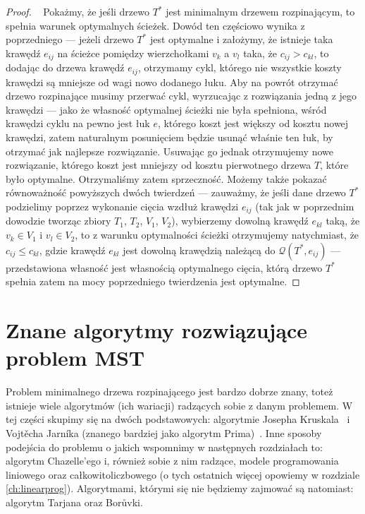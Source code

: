 \begin{proof}~\cite[$519$]{Ahuja:1993:NFT:137406}
	Pokażmy, że jeśli drzewo $T^{\ast}$ jest minimalnym drzewem rozpinającym, to spełnia warunek optymalnych ścieżek.
	Dowód ten częściowo wynika z poprzedniego --- jeżeli drzewo $T^{\ast}$ jest optymalne i założymy, że istnieje taka krawędź $e_{ij}$ na ścieżce pomiędzy wierzchołkami $v_{k}$ a $v_{l}$ taka, że $c_{ij} > c_{kl}$, to dodając do drzewa krawędź $e_{ij}$, otrzymamy cykl, którego nie wszystkie koszty krawędzi są mniejsze od wagi nowo dodanego łuku. Aby na powrót otrzymać drzewo rozpinające musimy przerwać cykl, wyrzucając z rozwiązania jedną z jego krawędzi --- jako że własność optymalnej ścieżki nie była spełniona, wśród krawędzi cyklu na pewno jest łuk $e$, którego koszt jest większy od kosztu nowej krawędzi, zatem naturalnym posunięciem będzie usunąć właśnie ten łuk, by otrzymać jak najlepsze rozwiązanie. Usuwając go jednak otrzymujemy nowe rozwiązanie, którego koszt jest mniejszy od kosztu pierwotnego drzewa $T$, które było optymalne. Otrzymaliśmy zatem sprzeczność.
	Możemy także pokazać równoważność powyższych dwóch twierdzeń --- zauważmy, że jeśli dane drzewo $T^{\ast}$ podzielimy poprzez wykonanie cięcia wzdłuż krawędzi $e_{ij}$ (tak jak w poprzednim dowodzie tworząc zbiory $T_{1}$, $T_{2}$, $V_{1}$, $V_{2}$), wybierzemy dowolną krawędź $e_{kl}$ taką, że $v_{k} \in V_{1}$ i $v_{l} \in V_{2}$, to z warunku optymalności ścieżki otrzymujemy natychmiast, że $c_{ij} \leqslant c_{kl}$, gdzie krawędź $e_{kl}$ jest dowolną krawędzią należącą do $\mathcal{Q} \left( T^{\ast}, e_{ij} \right)$ --- przedstawiona własność jest własnością optymalnego cięcia, którą drzewo $T^{\ast}$ spełnia zatem na mocy poprzedniego twierdzenia jest optymalne.
\end{proof}

\section{Znane algorytmy rozwiązujące problem MST}

Problem minimalnego drzewa rozpinającego jest bardzo dobrze znany, toteż istnieje wiele algorytmów (ich wariacji)  radzących sobie z danym problemem. W tej części skupimy się na dwóch podstawowych: algorytmie Josepha Kruskala~\cite[$520$--$522$]{Ahuja:1993:NFT:137406} i Vojtěcha Jarníka (znanego bardziej jako algorytm Prima)~\cite[$523$--$525$]{Ahuja:1993:NFT:137406}. Inne sposoby podejścia do problemu o jakich wspomnimy w następnych rozdziałach to: algorytm Chazelle'ego i, również sobie z nim radzące, modele programowania liniowego oraz całkowitoliczbowego (o tych ostatnich więcej opowiemy w rozdziale \ref{ch:linearprog}). Algorytmami, którymi się nie będziemy zajmować są natomiast: algorytm Tarjana oraz Borůvki.

